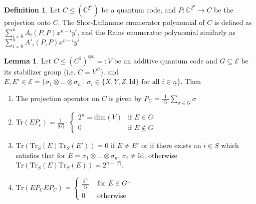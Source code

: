\documentclass{article}
\def\C{\mathbb{C}}
\def\fa{\text{ for all }}
\def\Tr{\text{Tr}}
\def\Id{\text{Id}}
\theoremstyle{definition}
\newtheorem{defn}[Satz]{Definition}
\newtheorem{lem}[Satz]{Lemma}
\begin{document}
\begin{defn}
Let $C \leq (\C^{2^n})$ be a quantum code, and $P: \C^{2^n} \rightarrow C$ be the projection onto $C$. 
The Shor-Laflamme enumerator polynomial of $C$ is defined as $ \sum_{i=0}^n A_i(P,P) x^{n-i}y^i$, and the Rains enumerator polynomial similarly as  $\sum_{i=0}^n A'_i(P,P) x^{n-i}y^i$
\end{defn}

\begin{lem}\label{lemmaenums}
Let $C \leq (C^2)^{\otimes n} =: V$ be an additive quantum code and $G \subseteq \mathcal{E}$ be its stabilizer group (i.e. $C = V^G$). and $E,E' \in \mathcal{E} = \{ \sigma_1 \otimes \ldots \otimes \sigma_n \mid \sigma_i \in \{X,Y,Z,\Id \} \fa i \in \underline{n} \}$. Then
\begin{enumerate}
\item The projection operator on $C$ is given by $P_C = \frac{1}{|G|} \sum_{\sigma \in G} \sigma$
\item Tr$(EP_c) = \frac{1}{|G|} \cdot \left\{ \begin{array}{lr} 2^n = \text{dim}(V) & \text{if } E \in G \\ 0 & \text{if } E \notin G \end{array} \right.$
\item $\Tr(\Tr_S(E)\Tr_S(E')) = 0$ if $E \neq E'$ or if there exists an $i \in S$ which satisfies that for $E = \sigma_1 \otimes \ldots \otimes \sigma_n$, $\sigma_i \neq \Id$, otherwise $\Tr(\Tr_S(E)\Tr_S(E)) = 2^{n+|S|}$.
\item $\Tr( E P_C E P_C) = \left\{ \begin{array}{lr} \frac{2^n}{|G|} & \text{ for } E \in G^\perp \\ 0 & \text{ otherwise} \end{array} \right.$ 
\end{enumerate}


\end{lem}
\end{document}

